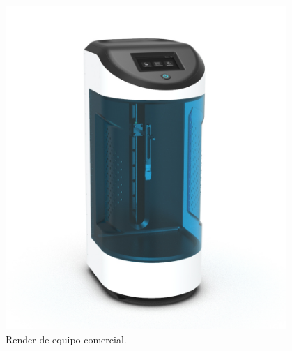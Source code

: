 \begin{itemize}
\begin{figure}[h!]
	\centering
	\includegraphics[width=0.95\textwidth]{./Figures/new_dip.png}
	\caption{Render de equipo comercial.}
	\label{fig:new_dip}
\end{figure}

\end{itemize}


